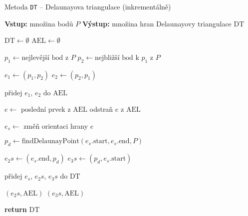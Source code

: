 \begin{algorithm}
    \caption{Metoda \texttt{DT} -- Delaunayova triangulace (inkrementálně)}
    \begin{algorithmic}[1]
        \STATE \textbf{Vstup:} množina bodů $P$
        \STATE \textbf{Výstup:} množina hran Delaunayovy triangulace $\text{DT}$

        \STATE $\text{DT} \gets \emptyset$ 
        \STATE $\text{AEL} \gets \emptyset$ 

        \STATE $p_1 \gets \text{nejlevější bod z } P$ 
        \STATE $p_2 \gets \text{nejbližší bod k } p_1 \text{ z } P$

        \STATE $e_1 \gets (p_1, p_2)$
        \STATE $e_2 \gets (p_2, p_1)$

        \STATE přidej $e_1$, $e_2$ do $\text{AEL}$

            \STATE $e \gets$ poslední prvek z $\text{AEL}$
            \STATE odstraň $e$ z $\text{AEL}$

            \STATE $e_s \gets$ změň orientaci hrany $e$

            \STATE $p_d \gets \text{findDelaunayPoint}(e_s.\text{start}, e_s.\text{end}, P)$

                \STATE $e_2s \gets (e_s.\text{end}, p_d)$
                \STATE $e_3s \gets (p_d, e_s.\text{start})$

                \STATE přidej $e_s$, $e_2s$, $e_3s$ do $\text{DT}$

                \STATE {}$(e_2s, \text{AEL})$
                \STATE {}$(e_3s, \text{AEL})$
            \ENDIF
        \ENDWHILE

        \STATE \textbf{return} $\text{DT}$
    \end{algorithmic}
\end{algorithm}

